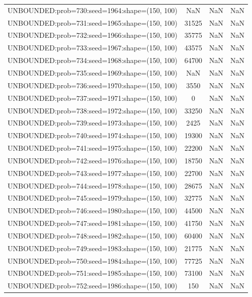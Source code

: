\begin{longtable}{lccc}
UNBOUNDED:prob=730:seed=1964:shape=(150, 100) &   NaN &   NaN &    NaN \\
UNBOUNDED:prob=731:seed=1965:shape=(150, 100) & 31525 &   NaN &    NaN \\
UNBOUNDED:prob=732:seed=1966:shape=(150, 100) & 35775 &   NaN &    NaN \\
UNBOUNDED:prob=733:seed=1967:shape=(150, 100) & 43575 &   NaN &    NaN \\
UNBOUNDED:prob=734:seed=1968:shape=(150, 100) & 64700 &   NaN &    NaN \\
UNBOUNDED:prob=735:seed=1969:shape=(150, 100) &   NaN &   NaN &    NaN \\
UNBOUNDED:prob=736:seed=1970:shape=(150, 100) &  3550 &   NaN &    NaN \\
UNBOUNDED:prob=737:seed=1971:shape=(150, 100) &     0 &   NaN &    NaN \\
UNBOUNDED:prob=738:seed=1972:shape=(150, 100) & 33250 &   NaN &    NaN \\
UNBOUNDED:prob=739:seed=1973:shape=(150, 100) &  2425 &   NaN &    NaN \\
UNBOUNDED:prob=740:seed=1974:shape=(150, 100) & 19300 &   NaN &    NaN \\
UNBOUNDED:prob=741:seed=1975:shape=(150, 100) & 22200 &   NaN &    NaN \\
UNBOUNDED:prob=742:seed=1976:shape=(150, 100) & 18750 &   NaN &    NaN \\
UNBOUNDED:prob=743:seed=1977:shape=(150, 100) & 22700 &   NaN &    NaN \\
UNBOUNDED:prob=744:seed=1978:shape=(150, 100) & 28675 &   NaN &    NaN \\
UNBOUNDED:prob=745:seed=1979:shape=(150, 100) & 32775 &   NaN &    NaN \\
UNBOUNDED:prob=746:seed=1980:shape=(150, 100) & 44500 &   NaN &    NaN \\
UNBOUNDED:prob=747:seed=1981:shape=(150, 100) & 41750 &   NaN &    NaN \\
UNBOUNDED:prob=748:seed=1982:shape=(150, 100) & 60400 &   NaN &    NaN \\
UNBOUNDED:prob=749:seed=1983:shape=(150, 100) & 21775 &   NaN &    NaN \\
UNBOUNDED:prob=750:seed=1984:shape=(150, 100) & 77725 &   NaN &    NaN \\
UNBOUNDED:prob=751:seed=1985:shape=(150, 100) & 73100 &   NaN &    NaN \\
UNBOUNDED:prob=752:seed=1986:shape=(150, 100) &   150 &   NaN &    NaN \\

\end{longtable}
